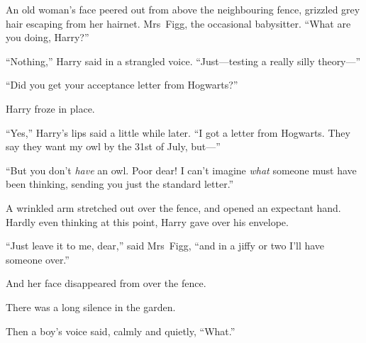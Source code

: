 An old woman’s face peered out from above the neighbouring fence, grizzled grey hair escaping from her hairnet. Mrs~Figg, the occasional babysitter. “What are you doing, Harry?”

“Nothing,” Harry said in a strangled voice. “Just—testing a really silly theory—”

“Did you get your acceptance letter from Hogwarts?”

Harry froze in place.

“Yes,” Harry’s lips said a little while later. “I got a letter from Hogwarts. They say they want my owl by the 31st of July, but—”

“But you don’t \emph{have} an owl. Poor dear! I can’t imagine \emph{what} someone must have been thinking, sending you just the standard letter.”

A wrinkled arm stretched out over the fence, and opened an expectant hand. Hardly even thinking at this point, Harry gave over his envelope.

“Just leave it to me, dear,” said Mrs~Figg, “and in a jiffy or two I’ll have someone over.”

And her face disappeared from over the fence.

There was a long silence in the garden.

Then a boy’s voice said, calmly and quietly, “What.”
